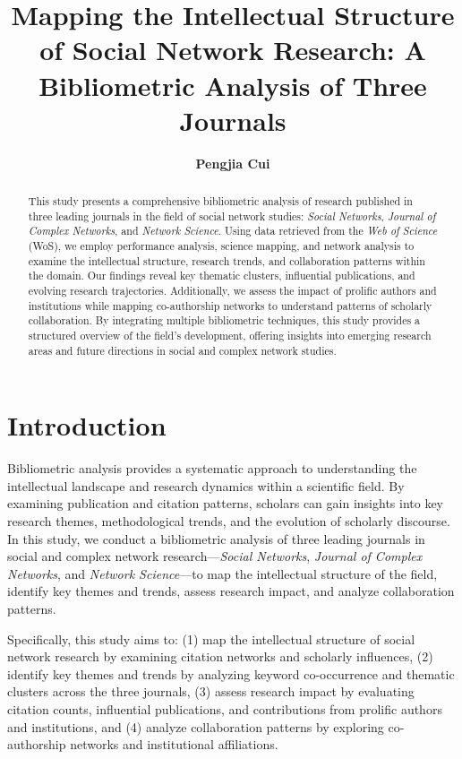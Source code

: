 \documentclass[twocolumn]{article}
\title{\textbf{Mapping the Intellectual Structure of Social Network Research: A Bibliometric Analysis of Three Journals}}
\author{\textbf{Pengjia Cui}}
\begin{document}
	
	\maketitle
	
	\begin{abstract}
		This study presents a comprehensive bibliometric analysis of research published in three leading journals in the field of social network studies: \textit{Social Networks}, \textit{Journal of Complex Networks}, and \textit{Network Science}. Using data retrieved from the \textit{Web of Science} (WoS), we employ performance analysis, science mapping, and network analysis to examine the intellectual structure, research trends, and collaboration patterns within the domain. Our findings reveal key thematic clusters, influential publications, and evolving research trajectories. Additionally, we assess the impact of prolific authors and institutions while mapping co-authorship networks to understand patterns of scholarly collaboration. By integrating multiple bibliometric techniques, this study provides a structured overview of the field’s development, offering insights into emerging research areas and future directions in social and complex network studies.
	\end{abstract}
	
	\section{Introduction}\label{Introduction}
	
	Bibliometric analysis provides a systematic approach to understanding the intellectual landscape and research dynamics within a scientific field. By examining publication and citation patterns, scholars can gain insights into key research themes, methodological trends, and the evolution of scholarly discourse. In this study, we conduct a bibliometric analysis of three leading journals in social and complex network research—\textit{Social Networks}, \textit{Journal of Complex Networks}, and \textit{Network Science}—to map the intellectual structure of the field, identify key themes and trends, assess research impact, and analyze collaboration patterns.
	
	Specifically, this study aims to: (1) map the intellectual structure of social network research by examining citation networks and scholarly influences, (2) identify key themes and trends by analyzing keyword co-occurrence and thematic clusters across the three journals, (3) assess research impact by evaluating citation counts, influential publications, and contributions from prolific authors and institutions, and (4) analyze collaboration patterns by exploring co-authorship networks and institutional affiliations.
	
\end{document}

